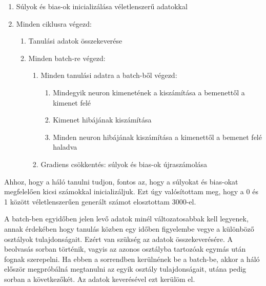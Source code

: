 \begin{enumerate}
   \item Súlyok és bias-ok inicializálása véletlenszerű adatokkal
   \item Minden ciklusra végezd:
   \begin{enumerate}
   		\item Tanulási adatok összekeverése
   		\item Minden batch-re végezd:
   		\begin{enumerate}  %
   			\item Minden tanulási adatra a batch-ből végezd:
			    \begin{enumerate}
			      \item Mindegyik neuron kimenetének a kiszámítása a bemenettől a kimenet felé
			      \item Kimenet hibájának kiszámítása
		    	  \item Minden neuron hibájának kiszámítása a kimenettől a bemenet felé haladva
			    \end{enumerate}
		    \item Gradiens csökkentés: súlyok és bias-ok újraszámolása 
   		\end{enumerate}
   \end{enumerate}
   
 \end{enumerate}
 
 Ahhoz, hogy a háló tanulni tudjon, fontos az, hogy a súlyokat és bias-okat megfelelően kicsi számokkal inicializáljuk. Ezt úgy valósítottam meg, hogy a 0 és 1 között véletlenszerűen generált számot elosztottam 3000-el.
 
 A batch-ben egyidőben jelen levő adatok minél változatosabbak kell legyenek, annak érdekében hogy tanulás közben egy időben figyelembe vegye a különböző osztályok tulajdonságait. Ezért van szükség az adatok összekeverésére. A beolvasás sorban történik, vagyis az azonos osztályba tartozóak egymás után fognak szerepelni. Ha ebben a sorrendben kerülnének be a batch-be, akkor a háló először megpróbálná megtanulni az egyik osztály tulajdonságait, utána pedig sorban a következőkét. Az adatok keverésével ezt kerülöm el. \cite{5}